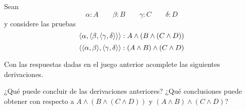\documentclass{article}
\begin{document}
\begin{exercise}
    Sean
    $$ \alpha : A\quad\quad \beta : B\quad\quad \gamma : C\quad\quad \delta : D $$
    y considere las pruebas
    $$
    \picopar{\alpha, \picopar{\beta, \picopar{\gamma, \delta}}} : A \wedge (B \wedge (C \wedge D))
    $$
    $$
        \picopar{\picopar{\alpha, \beta}, \picopar{\gamma, \delta}} : (A \wedge B) \wedge (C \wedge D)
    $$

    Con las respuestas dadas en el juego anterior acomplete las
    siguientes derivaciones.
    \begin{prooftree}
    \end{prooftree}

    \begin{prooftree}
    \end{prooftree}

    \begin{prooftree}
    \end{prooftree}

    \begin{prooftree}
    \end{prooftree}

    \noindent ¿Qué puede concluir de las derivaciones anteriores? ¿Qué conclusiones puede obtener con respecto a $A \wedge (B \wedge (C \wedge D))$ y
    $(A \wedge B) \wedge (C \wedge D)$?
\end{exercise}
\end{document}
